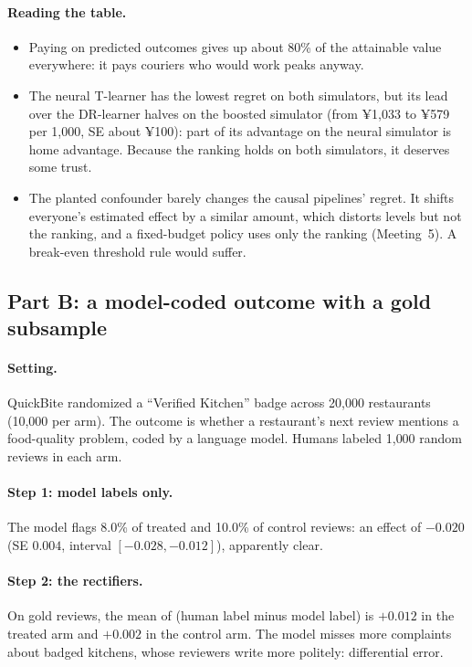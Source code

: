 \documentclass[11pt]{article}
\begin{document}
\paragraph{Reading the table.}
\begin{itemize}
  \item Paying on predicted outcomes gives up about 80\% of the attainable value everywhere: it pays couriers who would work peaks anyway.
  \item The neural T-learner has the lowest regret on both simulators, but its lead over the DR-learner halves on the boosted simulator (from
  ¥1{,}033 to ¥579 per 1{,}000, SE about ¥100): part of its advantage on the neural simulator is home advantage. Because the ranking holds on
  both simulators, it deserves some trust.
  \item The planted confounder barely changes the causal pipelines' regret. It shifts everyone's estimated effect by a similar amount, which
  distorts levels but not the ranking, and a fixed-budget policy uses only the ranking (Meeting~5). A break-even threshold rule would suffer.
\end{itemize}

\subsection*{Part B: a model-coded outcome with a gold subsample}

\paragraph{Setting.} QuickBite randomized a ``Verified Kitchen'' badge across 20{,}000 restaurants (10{,}000 per arm). The outcome is whether a
restaurant's next review mentions a food-quality problem, coded by a language model. Humans labeled 1{,}000 random reviews in each arm.

\paragraph{Step 1: model labels only.} The model flags 8.0\% of treated and 10.0\% of control reviews: an effect of $-0.020$ (SE $0.004$,
interval $[-0.028, -0.012]$), apparently clear.

\paragraph{Step 2: the rectifiers.} On gold reviews, the mean of (human label minus model label) is $+0.012$ in the treated arm and $+0.002$ in the
control arm. The model misses more complaints about badged kitchens, whose reviewers write more politely: differential error.
\end{document}
